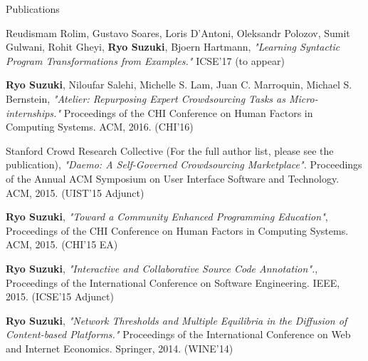 \documentclass{resume} %
\begin{document}
\begin{rSection}{Publications}




Reudismam Rolim, Gustavo Soares, Loris D'Antoni, Oleksandr Polozov, Sumit Gulwani, Rohit Gheyi, {\bf Ryo Suzuki}, Bjoern Hartmann, {\it "Learning Syntactic Program Transformations from Examples."} ICSE'17 (to appear)

{\bf Ryo Suzuki}, Niloufar Salehi, Michelle S. Lam,
Juan C. Marroquin, Michael S. Bernstein,
{\it "Atelier: Repurposing Expert Crowdsourcing Tasks as Micro-internships."} Proceedings of the CHI Conference on Human Factors in Computing Systems. ACM, 2016. (CHI'16)

Stanford Crowd Research Collective (For the full author list, please see the publication), {\it "Daemo: A Self-Governed Crowdsourcing Marketplace".} Proceedings of the Annual ACM Symposium on User Interface Software and Technology. ACM, 2015. (UIST'15 Adjunct)

{\bf Ryo Suzuki}, {\it "Toward a Community Enhanced Programming Education"}, Proceedings of the CHI Conference on Human Factors in Computing Systems. ACM, 2015. (CHI'15 EA)

{\bf Ryo Suzuki}, {\it "Interactive and Collaborative Source Code Annotation".}, Proceedings of the International Conference on Software Engineering. IEEE, 2015. (ICSE'15 Adjunct)

{\bf Ryo Suzuki}, {\it "Network Thresholds and Multiple Equilibria in the Diffusion of Content-based Platforms."} Proceedings of the International Conference on Web and Internet Economics. Springer, 2014. (WINE'14)


\end{rSection}
\end{document}
